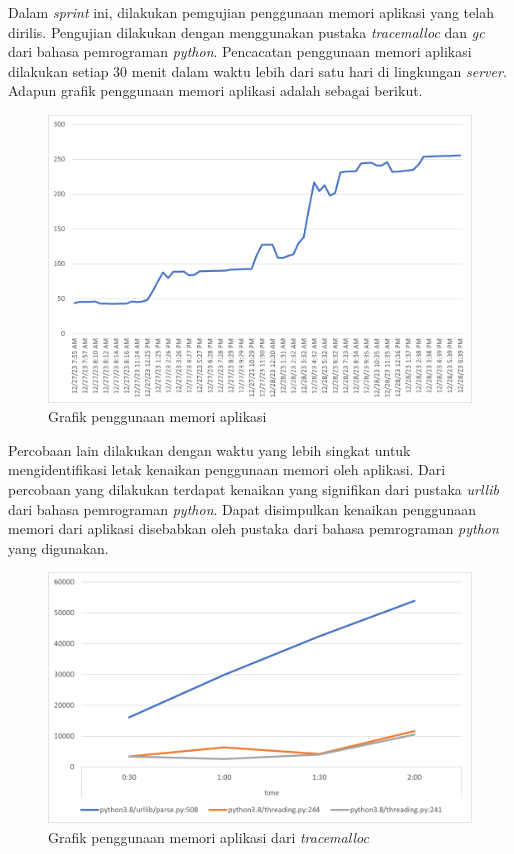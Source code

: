 Dalam \textit{sprint} ini, dilakukan pemgujian penggunaan memori aplikasi yang telah dirilis. Pengujian dilakukan dengan menggunakan pustaka \textit{tracemalloc} dan \textit{gc} dari bahasa pemrograman \textit{python}. Pencacatan penggunaan memori aplikasi dilakukan setiap 30 menit dalam waktu lebih dari satu hari di lingkungan \textit{server}. Adapun grafik penggunaan memori aplikasi adalah sebagai berikut.

\begin{figure}[H]
	\centering
	\includegraphics[keepaspectratio, width=13cm]{gambar/memchart.png}
	\caption{Grafik penggunaan memori aplikasi}
	\label{gambar:memchart.png}
\end{figure}


Percobaan lain dilakukan dengan waktu yang lebih singkat untuk mengidentifikasi letak kenaikan penggunaan memori oleh aplikasi. Dari percobaan yang dilakukan terdapat kenaikan yang signifikan dari pustaka \textit{urllib} dari bahasa pemrograman \textit{python}. Dapat disimpulkan kenaikan penggunaan memori dari aplikasi disebabkan oleh pustaka dari bahasa pemrograman \textit{python} yang digunakan.

\begin{figure}[H]
	\centering
	\includegraphics[keepaspectratio, width=13cm]{gambar/stacktrace_chart.png}
	\caption{Grafik penggunaan memori aplikasi dari \textit{tracemalloc}}
	\label{gambar:stacktrace_chart.png}
\end{figure}

